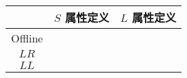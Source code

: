 
\begin{table}
  \begin{tabular}{|c||c|c|}
    \hline
    & $S$ 属性定义 & $L$ 属性定义
    \\ \hline \hline
    Offline & & \\ \hline
    $LR$ & & \\ \hline
    $LL$ & & \\ \hline
  \end{tabular}
\end{table}